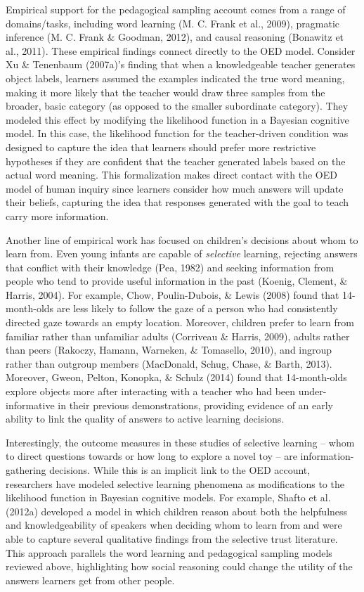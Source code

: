 \documentclass[oneside]{report}
\begin{document}
Empirical support for the pedagogical sampling account comes from a
range of domains/tasks, including word learning (M. C. Frank et al.,
2009), pragmatic inference (M. C. Frank \& Goodman, 2012), and causal
reasoning (Bonawitz et al., 2011). These empirical findings connect
directly to the OED model. Consider Xu \& Tenenbaum (2007a)'s finding
that when a knowledgeable teacher generates object labels, learners
assumed the examples indicated the true word meaning, making it more
likely that the teacher would draw three samples from the broader, basic
category (as opposed to the smaller subordinate category). They modeled
this effect by modifying the likelihood function in a Bayesian cognitive
model. In this case, the likelihood function for the teacher-driven
condition was designed to capture the idea that learners should prefer
more restrictive hypotheses if they are confident that the teacher
generated labels based on the actual word meaning. This formalization
makes direct contact with the OED model of human inquiry since learners
consider how much answers will update their beliefs, capturing the idea
that responses generated with the goal to teach carry more information.

Another line of empirical work has focused on children's decisions about
whom to learn from. Even young infants are capable of \emph{selective}
learning, rejecting answers that conflict with their knowledge (Pea,
1982) and seeking information from people who tend to provide useful
information in the past (Koenig, Clement, \& Harris, 2004). For example,
Chow, Poulin-Dubois, \& Lewis (2008) found that 14-month-olds are less
likely to follow the gaze of a person who had consistently directed gaze
towards an empty location. Moreover, children prefer to learn from
familiar rather than unfamiliar adults (Corriveau \& Harris, 2009),
adults rather than peers (Rakoczy, Hamann, Warneken, \& Tomasello,
2010), and ingroup rather than outgroup members (MacDonald, Schug,
Chase, \& Barth, 2013). Moreover, Gweon, Pelton, Konopka, \& Schulz
(2014) found that 14-month-olds explore objects more after interacting
with a teacher who had been under-informative in their previous
demonstrations, providing evidence of an early ability to link the
quality of answers to active learning decisions.

Interestingly, the outcome measures in these studies of selective
learning -- whom to direct questions towards or how long to explore a
novel toy -- are information-gathering decisions. While this is an
implicit link to the OED account, researchers have modeled selective
learning phenomena as modifications to the likelihood function in
Bayesian cognitive models. For example, Shafto et al. (2012a) developed
a model in which children reason about both the helpfulness and
knowledgeability of speakers when deciding whom to learn from and were
able to capture several qualitative findings from the selective trust
literature. This approach parallels the word learning and pedagogical
sampling models reviewed above, highlighting how social reasoning could
change the utility of the answers learners get from other people.
\end{document}
